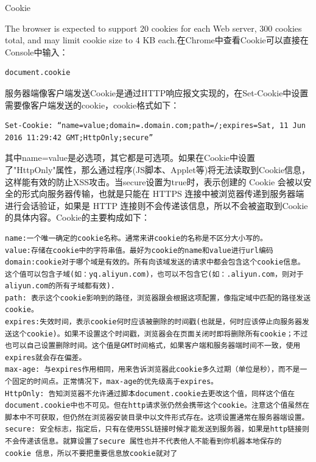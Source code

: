 \documentclass[12pt]{book}
\makeatletter
\numberwithin{dummy}{section}
\theoremstyle{ocrenumbox}
\theoremstyle{blacknumex}
\theoremstyle{blacknumbox}
\theoremstyle{ocrenum}
\renewcommand{\section}{\@startsection{section}{1}{\z@}
	{-4ex \@plus -1ex \@minus -.4ex}
	{1ex \@plus.2ex }
	{\normalfont\large\sffamily\bfseries}}
\makeatother
\begin{document}
\section{Cookie}

The browser is expected to support 20 cookies for each Web server, 300 cookies total, and may limit cookie size to 4 KB each.在Chrome中查看Cookie可以直接在Console中输入：

\begin{lstlisting}[language=Bash]
document.cookie
\end{lstlisting}

服务器端像客户端发送Cookie是通过HTTP响应报文实现的，在Set-Cookie中设置需要像客户端发送的cookie，cookie格式如下：

\begin{lstlisting}
Set-Cookie: “name=value;domain=.domain.com;path=/;expires=Sat, 11 Jun 2016 11:29:42 GMT;HttpOnly;secure”
\end{lstlisting}

其中name=value是必选项，其它都是可选项。如果在Cookie中设置了"HttpOnly"属性，那么通过程序(JS脚本、Applet等)将无法读取到Cookie信息，这样能有效的防止XSS攻击。当secure设置为true时，表示创建的 Cookie 会被以安全的形式向服务器传输，也就是只能在 HTTPS 连接中被浏览器传递到服务器端进行会话验证，如果是 HTTP 连接则不会传递该信息，所以不会被盗取到Cookie 的具体内容。Cookie的主要构成如下：

\begin{lstlisting}
name:一个唯一确定的cookie名称。通常来讲cookie的名称是不区分大小写的。
value:存储在cookie中的字符串值。最好为cookie的name和value进行url编码
domain:cookie对于哪个域是有效的。所有向该域发送的请求中都会包含这个cookie信息。这个值可以包含子域(如：yq.aliyun.com)，也可以不包含它(如：.aliyun.com，则对于aliyun.com的所有子域都有效).
path: 表示这个cookie影响到的路径，浏览器跟会根据这项配置，像指定域中匹配的路径发送cookie。
expires:失效时间，表示cookie何时应该被删除的时间戳(也就是，何时应该停止向服务器发送这个cookie)。如果不设置这个时间戳，浏览器会在页面关闭时即将删除所有cookie；不过也可以自己设置删除时间。这个值是GMT时间格式，如果客户端和服务器端时间不一致，使用expires就会存在偏差。
max-age: 与expires作用相同，用来告诉浏览器此cookie多久过期（单位是秒），而不是一个固定的时间点。正常情况下，max-age的优先级高于expires。
HttpOnly: 告知浏览器不允许通过脚本document.cookie去更改这个值，同样这个值在document.cookie中也不可见。但在http请求张仍然会携带这个cookie。注意这个值虽然在脚本中不可获取，但仍然在浏览器安装目录中以文件形式存在。这项设置通常在服务器端设置。
secure: 安全标志，指定后，只有在使用SSL链接时候才能发送到服务器，如果是http链接则不会传递该信息。就算设置了secure 属性也并不代表他人不能看到你机器本地保存的 cookie 信息，所以不要把重要信息放cookie就对了
\end{lstlisting}
\end{document}
